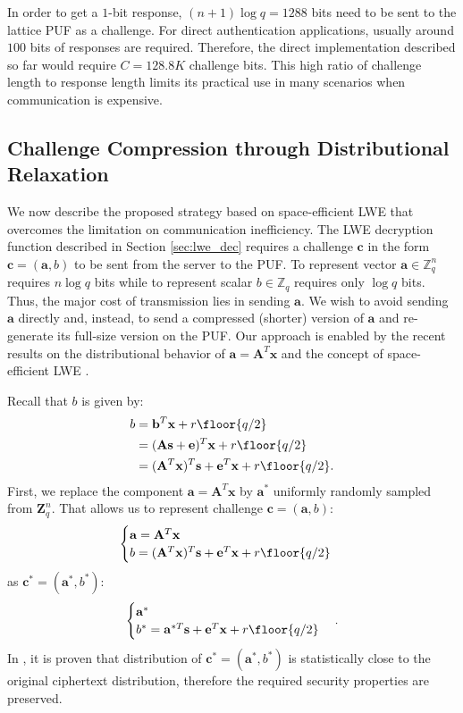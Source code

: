 In order to get a $1$-bit response, $(n+1)\log q = 1288$ bits need to be sent to the lattice PUF as a challenge.
For direct authentication applications, usually around $100$ bits of responses are required. Therefore, the direct implementation described so far would require $C = 128.8K$ challenge bits.
This high ratio of challenge length to response length limits its practical use in many scenarios when communication is expensive. 

\vspace{-0.5em}
\subsection{Challenge Compression through Distributional Relaxation}
\label{sec:lfsr}
We now describe the proposed strategy based on space-efficient LWE that overcomes the limitation on communication inefficiency.
The LWE decryption function described in Section \ref{sec:lwe_dec} requires a challenge $\mathbf{c}$ in the form $\mathbf{c}=(\mathbf{a},b)$ to be sent from the server to the PUF. 
To represent vector $\mathbf{a} \in \mathbb{Z}_q^n$ requires $n\log q$ bits while to represent scalar $b \in \mathbb{Z}_q$  requires only $\log q$ bits. 
Thus, the major cost of transmission lies in sending $\mathbf{a}$. 
We wish to avoid sending $\mathbf{a}$ directly and, instead, to send a compressed (shorter) version of $\mathbf{a}$  and re-generate its full-size version on the PUF.
Our approach is enabled by the recent results on the distributional behavior of $\mathbf{a}=\mathbf{A}^T\mathbf{x}$ \cite{akavia2009simultaneous} and the concept of space-efficient LWE \cite{galbraith2013space}.

Recall that $b$ is given by: 
\begin{align*}
    b&=\mathbf{b}^T\mathbf{x}+r\floor{q/2}\\
    &= (\mathbf{A}\mathbf{s}+\mathbf{e})^T\mathbf{x}+r\floor{q/2}\\
    &=(\mathbf{A}^T\mathbf{x})^T\mathbf{s}+\mathbf{e}^T\mathbf{x}+r\floor{q/2}.
\end{align*}
First, we replace the component $\mathbf{a}=\mathbf{A}^T\mathbf{x}$ by $\mathbf{a}^*$ uniformly randomly sampled from $\mathbf{Z}_q^n$. That allows us to represent challenge $\mathbf{c} = (\mathbf{a},b)$:
\begin{equation*}
    \begin{cases}
    \mathbf{a}= \mathbf{A}^T\mathbf{x}\\
    b = (\mathbf{A}^T\mathbf{x})^T\mathbf{s}+\mathbf{e}^T\mathbf{x}+r\floor{q/2}
    \end{cases}
\end{equation*}
as $\mathbf{c}^*=(\mathbf{a}^*,b^*)$:
\begin{equation*}
    \begin{cases}
    \mathbf{a}^*\\
    b^*=\mathbf{a}^{*T}\mathbf{s}+\mathbf{e}^T\mathbf{x}+r\floor{q/2}
    \end{cases}.
\end{equation*}
In \cite{akavia2009simultaneous}, it is proven that distribution of $\mathbf{c}^*=(\mathbf{a}^*,b^*)$ is statistically close to the original ciphertext distribution, therefore the required security properties are preserved.  

